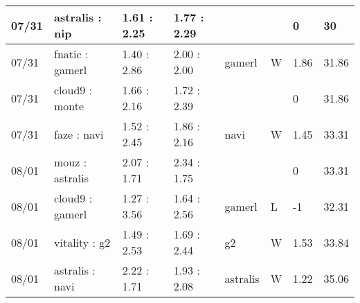\begin{small}
\begin{longtable}{|l|l|l|l|l|l|l|l|}
	07/31                               & astralis : nip                      & 1.61 : 2.25                             & 1.77 : 2.29                             &                                   &                                   & 0                                    & 30                                \\ \hline
	07/31                               & fnatic : gamerl                     & 1.40 : 2.86                             & 2.00 : 2.00                             & gamerl                            & W                                 & 1.86                                 & 31.86                             \\ \hline
	07/31                               & cloud9 : monte                      & 1.66 : 2.16                             & 1.72 : 2.39                             &                                   &                                   & 0                                    & 31.86                             \\ \hline
	07/31                               & faze : navi                         & 1.52 : 2.45                             & 1.86 : 2.16                             & navi                              & W                                 & 1.45                                 & 33.31                             \\ \hline
	08/01                               & mouz : astralis                     & 2.07 : 1.71                             & 2.34 : 1.75                             &                                   &                                   & 0                                    & 33.31                             \\ \hline
	08/01                               & cloud9 : gamerl                     & 1.27 : 3.56                             & 1.64 : 2.56                             & gamerl                            & L                                 & -1                                   & 32.31                             \\ \hline
	08/01                               & vitality : g2                       & 1.49 : 2.53                             & 1.69 : 2.44                             & g2                                & W                                 & 1.53                                 & 33.84                             \\ \hline
	08/01                               & astralis : navi                     & 2.22 : 1.71                             & 1.93 : 2.08                             & astralis                          & W                                 & 1.22                                 & 35.06                             \\ \hline

\end{longtable}
\end{small}
